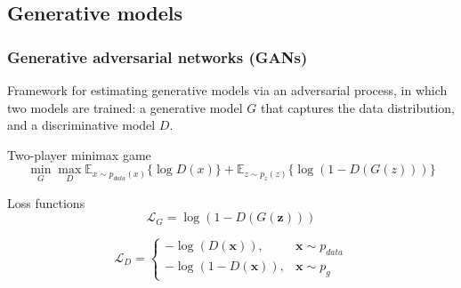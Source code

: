 \documentclass[t]{beamer}
\newcommand{\tensor}[1]{\mathbf{#1}}
\begin{document}
\subsection{Generative models}

\begin{frame}
\frametitle{Generative adversarial networks (GANs)}
Framework for estimating generative models via an adversarial
process, in which two models are trained: a generative model $G$ that captures
the data distribution, and a discriminative model $D$.

\begin{block}{Two-player minimax game}
\[
\min_G \max_D \mathbb{E}_{x \sim p_{data}(x)}\{\log D(x)\} +
\mathbb{E}_{z \sim p_z(z)} \{\log(1 - D(G(z)))\}
\]
\end{block}\pause

\begin{block}{Loss functions}
\[
\mathcal{L}_G = \log(1 - D(G(\tensor{z})))
\]

$$
\mathcal{L}_D =
  \begin{cases}
    - \log(D(\tensor{x})), & \tensor{x} \sim p_{data} \\
    - \log(1 - D(\tensor{x})), & \tensor{x} \sim p_g
  \end{cases}
$$
\end{block}

\end{frame}
\end{document}
